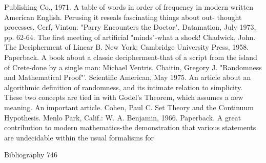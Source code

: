   Publishing Co., 1971. A table of words in order of frequency in modern written
  American English. Perusing it reseals fascinating things about out- thought processes.
Cerf, Vinton. "Parry Encounters the Doctor". Datamation, July 1973, pp. 62-64. The first
  meeting of artificial "minds"-what a shock!
Chadwick, John. The Decipherment of Linear B. New York: Cambridge University
  Press, 1958. Paperback. A book about a classic decipherment-that of a script from the
  island of Crete-done by a single man: Michael Ventris.
Chaitin, Gregory J. "Randomness and Mathematical Proof"'. Scientific American, May
  1975. An article about an algorithmic definition of randomness, and its intimate relation
  to simplicity. These two concepts are tied in with Godel's Theorem, which assumes a
  new meaning. An important article.
Cohen, Paul C. Set Theory and the Continuum Hypothesis. Menlo Park, Calif.: W. A.
  Benjamin, 1966. Paperback. A great contribution to modern mathematics-the
  demonstration that various statements are undecidable within the usual formalisms for

Bibliography                                                                            746

